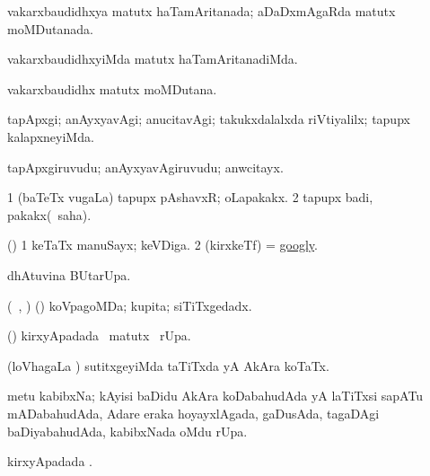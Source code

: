\bentry
{} 
\gl{\gu}
\expl{}
\bmng
vakarxbaudidhxya matutx haTamAritanada; aDaDxmAgaRda matutx moMDutanada. 
\emng
\eentry

\bentry
{} 
\gl{\kirxvi}
\expl{}
\bmng
vakarxbaudidhxyiMda matutx haTamAritanadiMda. 
\emng
\eentry

\bentry
{} 
\gl{\nA}
\expl{}
\bmng
vakarxbaudidhx matutx moMDutana. 
\emng
\eentry

\bentry
{} 
\gl{\kirxvi}
\expl{}
\bmng
tapApxgi; anAyxyavAgi; anucitavAgi; takukxdalalxda riVtiyalilx; tapupx kalapxneyiMda. 
\emng
\eentry

\bentry
{} 
\gl{\nA}
\expl{}
\bmng
tapApxgiruvudu; anAyxyavAgiruvudu; anwcitayx. 
\emng
\eentry

\bentry
{} 
\gl{\nA}
\expl{}
\bmng
\bnum
\num{1} (baTeTx \mo vugaLa) tapupx pAshavxR; oLapakakx. 
\num{2} tapupx badi, pakakx(\rUpa\ saha). 
\enum
\emng
\eentry

\bentry
{} 
\gl{\nA}
\expl{}
\bmng
(\AmA) 
\bnum
\num{1} keTaTx manuSayx; keVDiga. 
\num{2} (kirxkeTf) = \hyperref{kandict_g.pdf}{G}{googly}{googly}. 
\enum
\emng
\eentry

\bentry
{} 
\gl{\kirx}
\expl{}
\bmng
{} dhAtuvina BUtarUpa. 
\emng
\eentry

\bentry
{} 
\gl{\gu}
\expl{}
\bmng
(\rUpa\, \kAparx, \hA) (\pArxparx) koVpagoMDa; kupita; siTiTxgedadx. 
\emng
\eentry

\bentry
{} 
\gl{\kirx}
\expl{}
\bmng
(\pArxparx)  kirxyApadada \BU\ matutx \BUkaq\ rUpa. 
\emng
\eentry

\bentry
{} 
\gl{\gu}
\expl{}
\bmng
(loVhagaLa \vi) sutitxgeyiMda taTiTxda yA AkAra koTaTx. 
\emng
\eentry

\bentry
{} 
\gl{\nA}
\expl{}
\bmng
metu kabibxNa; kAyisi baDidu AkAra koDabahudAda yA laTiTxsi sapATu mADabahudAda, Adare eraka hoyayxlAgada, gaDusAda, tagaDAgi baDiyabahudAda, kabibxNada oMdu rUpa. 
\emng
\eentry

\bentry
{} 
\gl{\kirx}
\expl{}
\bmng
{} kirxyApadada \BUkaq. 
\emng
\eentry

\bentry
{} 
\gl{\saMkiSx}
\expl{}
\bmng
\eng{(} \birx\  
\emng
\eentry


